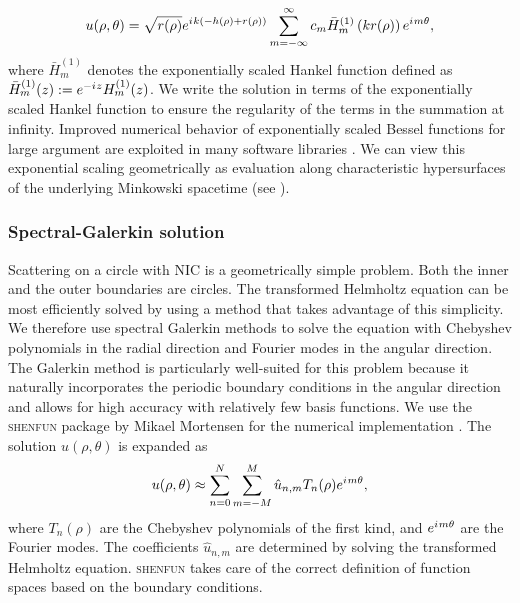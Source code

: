 \documentclass[onefignum,onetabnum]{siamart190516}
\newcommand{\iu}{{i\mkern1mu}}
\begin{document}
\begin{equation}
	u(\rho,\theta) = \sqrt{r(\rho)} e^{\iu k (-h(\rho)+r(\rho))} \sum_{m=-\infty}^{\infty} c_m \bar{H}_{m}^{(1)}\left(k r(\rho)\right) e^{\iu m \theta},
\end{equation}
where $\bar{H}_{m}^{(1)}$ denotes the exponentially scaled Hankel function defined as $\bar{H}_{m}^{(1)}(z) := e^{-\iu z} H_{m}^{(1)}(z)$. We write the solution in terms of the exponentially scaled Hankel function to ensure the regularity of the terms in the summation at infinity. Improved numerical behavior of exponentially scaled Bessel functions for large argument are exploited in many software libraries \cite{amos1986algorithm}. We can view this exponential scaling geometrically as evaluation along characteristic hypersurfaces of the underlying Minkowski spacetime (see \cite{ZengFramework, minucci2025confluent}). 


\subsubsection{Spectral-Galerkin solution}
Scattering on a circle with NIC is a geometrically simple problem. Both the inner and the outer boundaries are circles. The transformed Helmholtz equation can be most efficiently solved by using a method that takes advantage of this simplicity. We therefore use spectral Galerkin methods to solve the equation with Chebyshev polynomials in the radial direction and Fourier modes in the angular direction. The Galerkin method is particularly well-suited for this problem because it naturally incorporates the periodic boundary conditions in the angular direction and allows for high accuracy with relatively few basis functions. We use the \textsc{shenfun} package by Mikael Mortensen for the numerical implementation \cite{shenfun, mortensen_joss}. The solution $ u(\rho, \theta) $ is expanded as
\[
u(\rho, \theta) \approx \sum_{n=0}^{N} \sum_{m=-M}^{M} \hat{u}_{n,m} T_n(\rho) e^{\iu m \theta},
\]
where $ T_n(\rho) $ are the Chebyshev polynomials of the first kind, and $ e^{\iu m \theta} $ are the Fourier modes. The coefficients $ \hat{u}_{n,m} $ are determined by solving the transformed Helmholtz equation. \textsc{shenfun} takes care of the correct definition of function spaces based on the boundary conditions. 
\end{document}
